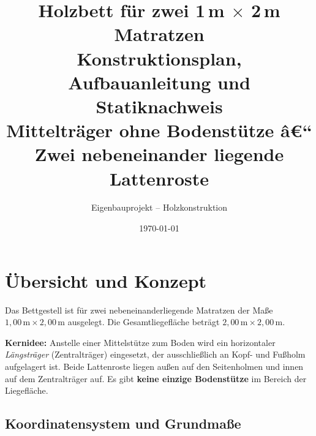 ﻿\documentclass[12pt,a4paper]{article}
\title{
  \vspace{-1cm}
  {\LARGE \textbf{Holzbett für zwei 1\,m $\times$ 2\,m Matratzen}}\\[0.5em]
  {\large Konstruktionsplan, Aufbauanleitung und Statiknachweis}\\[0.3em]
  {\normalsize Mittelträger ohne Bodenstütze â€“ Zwei nebeneinander liegende Lattenroste}
}
\author{Eigenbauprojekt -- Holzkonstruktion}
\date{\today}
\theoremstyle{definition}
\theoremstyle{plain}
\theoremstyle{remark}
\begin{document}
\maketitle
\thispagestyle{fancy}

\tableofcontents
\newpage

\section{Übersicht und Konzept}

Das Bettgestell ist für zwei nebeneinanderliegende Matratzen der Maße
$1{,}00\,\text{m} \times 2{,}00\,\text{m}$ ausgelegt. Die Gesamtliegefläche
beträgt $2{,}00\,\text{m} \times 2{,}00\,\text{m}$.

\medskip
\textbf{Kernidee:} Anstelle einer Mittelstütze zum Boden wird ein horizontaler
\emph{Längsträger} (Zentralträger) eingesetzt, der ausschließlich an Kopf- und
Fußholm aufgelagert ist. Beide Lattenroste liegen außen auf den Seitenholmen
und innen auf dem Zentralträger auf. Es gibt \textbf{keine einzige
Bodenstütze} im Bereich der Liegefläche.

\subsection{Koordinatensystem und Grundmaße}
\end{document}
